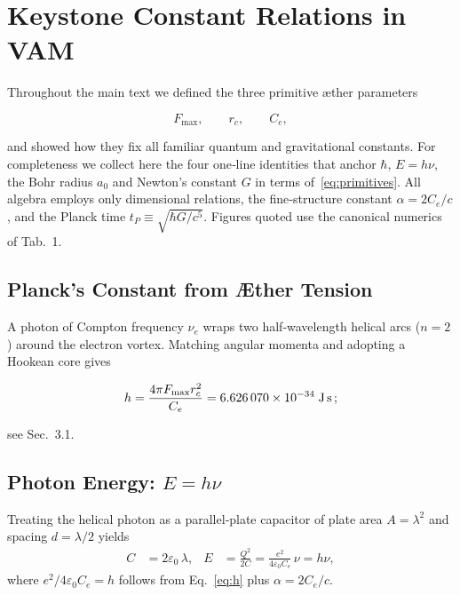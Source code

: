 

\section{Keystone Constant Relations in VAM}\label{sec:keystone-constant-relations-in-vam}

    Throughout the main text we defined the three primitive æther parameters

    \begin{equation}
        F_{\max}, \qquad r_c, \qquad C_e,
        \label{eq:primitives}
    \end{equation}

    and showed how they fix all familiar quantum and gravitational constants. For completeness we collect here the four one‑line identities that anchor \(\hbar\), \(E=h\nu\), the Bohr radius \(a_0\) and Newton's constant \(G\) in terms of~\eqref{eq:primitives}. All algebra employs only dimensional relations, the fine‑structure constant \(\alpha=2C_e/c\), and the Planck time \(t_P\equiv\sqrt{\hbar G/c^{5}}\). Figures quoted use the canonical numerics of Tab.~1.

    \subsection{Planck's Constant from Æther Tension}
    A photon of Compton frequency \(\nu_e\) wraps two half‑wavelength helical arcs (\(n=2\)) around the electron vortex. Matching angular momenta and adopting a Hookean core gives

    \begin{equation}
        h = \frac{4\pi F_{\max} r_c^{2}}{C_e}
        = 6.626\,070\times10^{-34}\;\text{J\,s}\,;
        \label{eq:h}
    \end{equation}

    see Sec.~3.1.

    \subsection{Photon Energy: \(E=h\nu\)}
    Treating the helical photon as a parallel‑plate capacitor of plate area
    \(A=\lambda^{2}\) and spacing \(d=\lambda/2\) yields
    \begin{align}
        C &= 2\varepsilon_0\,\lambda, &
        E &= \frac{Q^{2}}{2C} = \frac{e^{2}}{4\varepsilon_{0}C_e}\,\nu
        = h\nu,
        \label{eq:Einstein}
    \end{align}
    where \(e^{2}/4\varepsilon_{0}C_e=h\) follows from Eq.~\eqref{eq:h} plus
    \(\alpha=2C_e/c\).

